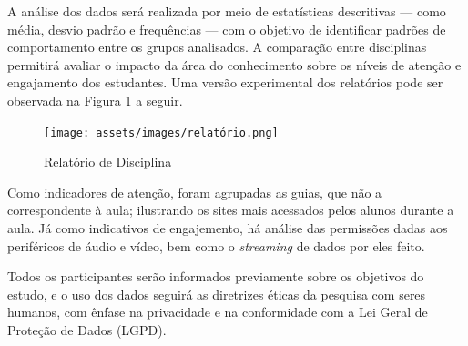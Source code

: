 A análise dos dados será realizada por meio de estatísticas descritivas — como média, desvio padrão e frequências —  com o objetivo de identificar padrões de comportamento entre os grupos analisados. A comparação entre disciplinas permitirá avaliar o impacto da área do conhecimento sobre os níveis de atenção e engajamento dos estudantes. Uma versão experimental dos relatórios pode ser observada na Figura \ref{fig:report} a seguir.

\begin{figure}[ht]
    \centering
    \texttt{[image: assets/images/relatório.png]}
    \caption{Relatório de Disciplina}
    \label{fig:report}
\end{figure}

Como indicadores de atenção, foram agrupadas as guias, que não a correspondente à aula; ilustrando os sites mais acessados pelos alunos durante a aula. Já como indicativos de engajemento, há análise das permissões dadas aos periféricos de áudio e vídeo, bem como o \textit{streaming} de dados por eles feito.


Todos os participantes serão informados previamente sobre os objetivos do estudo, e o uso dos dados seguirá as diretrizes éticas da pesquisa com seres humanos, com ênfase na privacidade e na conformidade com a Lei Geral de Proteção de Dados (LGPD).
